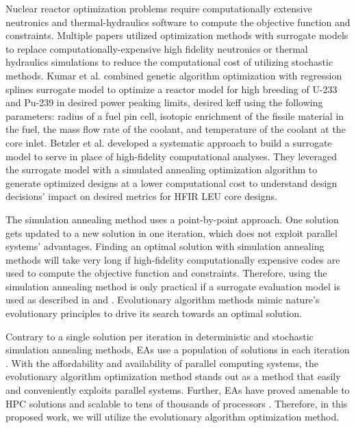 Nuclear reactor optimization problems require computationally 
extensive neutronics and thermal-hydraulics software to compute the objective 
function and constraints. 
Multiple papers utilized optimization methods with surrogate models to replace 
computationally-expensive high fidelity neutronics or thermal hydraulics 
simulations to reduce the computational cost of utilizing stochastic methods.
Kumar et al. \cite{kumar_new_2015} combined genetic algorithm optimization 
with regression splines surrogate model to optimize a reactor model for 
high breeding of U-233 and Pu-239 in desired power peaking limits, desired 
keff using the following parameters: radius of a fuel pin cell, isotopic enrichment 
of the fissile material in the fuel, the mass flow rate of the coolant, and 
temperature of the coolant at the core inlet.
Betzler et al. \cite{betzler_design_2019} developed a systematic approach to 
build a surrogate model to serve in place of high-fidelity computational 
analyses. 
They leveraged the surrogate model with a simulated annealing optimization 
algorithm to generate optimized designs at a lower computational cost to 
understand design decisions' impact on desired metrics for \gls{HFIR} \gls{LEU} 
core designs.

The simulation annealing method uses a point-by-point approach. 
One solution gets updated to a new solution in one iteration, which does not 
exploit parallel systems' advantages.
Finding an optimal solution with simulation annealing methods will take very 
long if high-fidelity computationally expensive codes are used to compute 
the objective function and constraints.
Therefore, using the simulation annealing method is only practical if a 
surrogate evaluation model is used as described in \cite{betzler_design_2019}
and \cite{kumar_new_2015}.
Evolutionary algorithm methods mimic nature's evolutionary principles to drive 
its search towards an optimal solution. 

Contrary to a single solution per iteration in deterministic and stochastic 
simulation annealing methods, \glspl{EA} use a population of solutions in each 
iteration \cite{deb_multi-objective_2001}. 
With the affordability and availability of parallel computing systems, the 
evolutionary algorithm optimization method stands out as a method 
that easily and conveniently exploits parallel systems. 
Further, \glspl{EA} have proved amenable to \gls{HPC} solutions and 
scalable to tens of thousands of processors \cite{kropaczek_constraint_2019}. 
Therefore, in this proposed work, we will utilize the evolutionary algorithm 
optimization method. 

